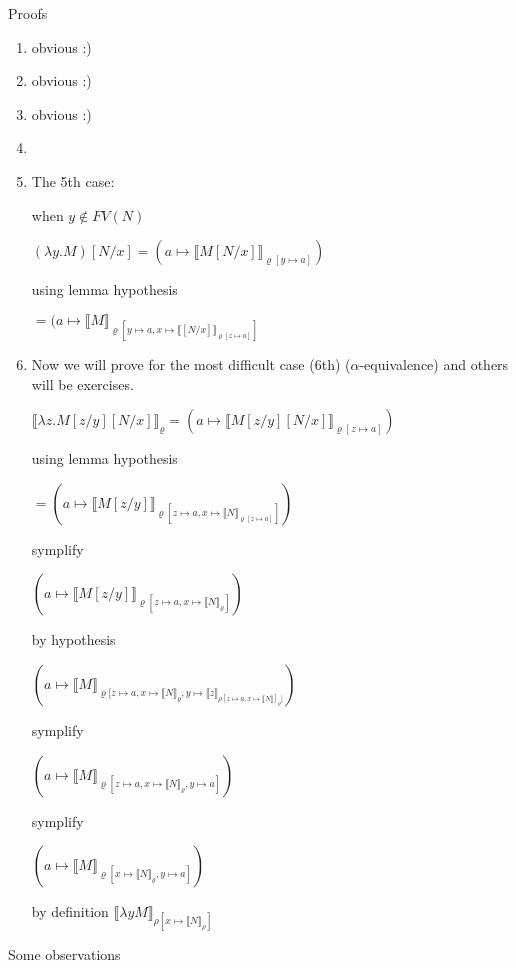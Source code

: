 \documentclass[a4paper,10pt]{book}
\begin{document}
Proofs
\begin{enumerate}
 \item obvious :)
 \item obvious :)
 \item obvious :)
 \item 
 \item The 5th case:

when $y \not\in FV(N)$

$(\lambda y . M)[N/x] = (a \mapsto \llbracket  M[N/x] \rrbracket_{\varrho[y \mapsto a]})$

using lemma hypothesis

$ = (a \mapsto \llbracket M\rrbracket_{\varrho[y \mapsto a, x \mapsto \llbracket [N/x] \rrbracket_{\varrho[z \mapsto a] }]}$


\item 
Now we will prove for the most difficult case (6th) ($\alpha$-equivalence) and others will be exercises.

$\llbracket \lambda z . M[z/y][N/x]\rrbracket_\varrho = (a \mapsto 
 \llbracket  M[z/y][N/x] \rrbracket_{\varrho[z \mapsto a]})$

using lemma hypothesis
 
$ = (a \mapsto \llbracket M[z/y]\rrbracket_{\varrho[z \mapsto a, x \mapsto \llbracket N \rrbracket_{\varrho[z \mapsto a] }]})$

symplify

$(a \mapsto \llbracket M[z/y]\rrbracket_{\varrho[z \mapsto a, x \mapsto \llbracket N \rrbracket_\varrho ]})$

by hypothesis

$(a \mapsto \llbracket M\rrbracket_{\varrho[z \mapsto a, x \mapsto \llbracket N \rrbracket_\varrho,y \mapsto\llbracket z\rrbracket_{\rho[z \mapsto a, x \mapsto \llbracket N\rrbracket]_\varrho ]}})$

symplify

$(a \mapsto \llbracket M\rrbracket_{\varrho[z \mapsto a, x \mapsto \llbracket N \rrbracket_\varrho,y \mapsto a]})$

symplify

$(a \mapsto \llbracket M\rrbracket_{\varrho[         x \mapsto \llbracket N \rrbracket_\varrho,y \mapsto a]})$

by definition
$\llbracket \lambda y M \rrbracket_{\rho[x \mapsto \llbracket N\rrbracket_\rho]}$

\end{enumerate}



Some observations
\end{document}
